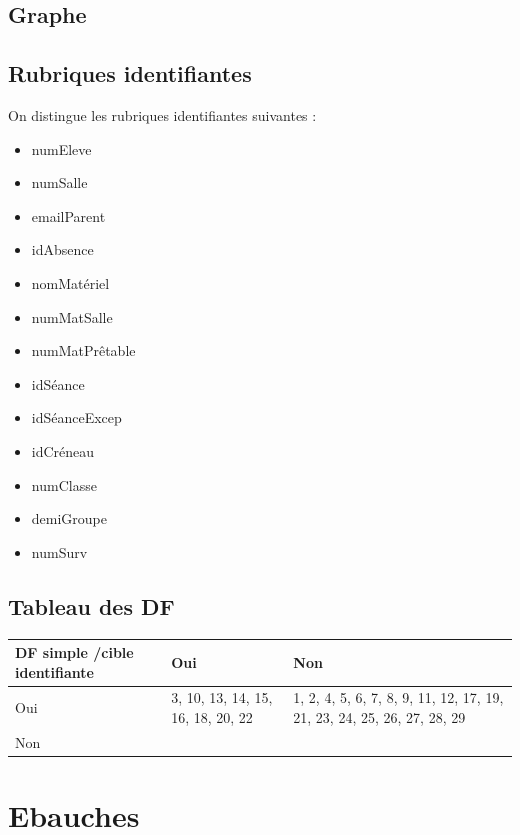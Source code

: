 \documentclass[12pt,french,titlepage]{article}
\begin{document}
      \subsection{Graphe}
      
      \subsection{Rubriques identifiantes}
      
      On distingue les rubriques identifiantes suivantes :
      
      \begin{itemize}
          \item numEleve
          \item numSalle
          \item emailParent
          \item idAbsence
          \item nomMatériel
          \item numMatSalle
          \item numMatPrêtable
          \item idSéance
          \item idSéanceExcep
          \item idCréneau
          \item numClasse
          \item demiGroupe
          \item numSurv
          
      \end{itemize}

    \subsection{Tableau des DF}
    
    \begin{tabular}{|p{4cm}|p{5cm}|p{5cm}|}
    \hline
        DF simple /cible identifiante & Oui & Non\\
        \hline
        Oui &  3, 10, 13, 14, 15, 16, 18, 20, 22  
        & 1, 2, 4, 5, 6, 7, 8, 9, 11, 12, 17, 19, 21, 23, 24, 25, 26, 27, 28, 29 \\
         \hline
        Non & & \\
        \hline
        
        
    \end{tabular}

	    
	   \section{Ebauches}
	   
\end{document}
